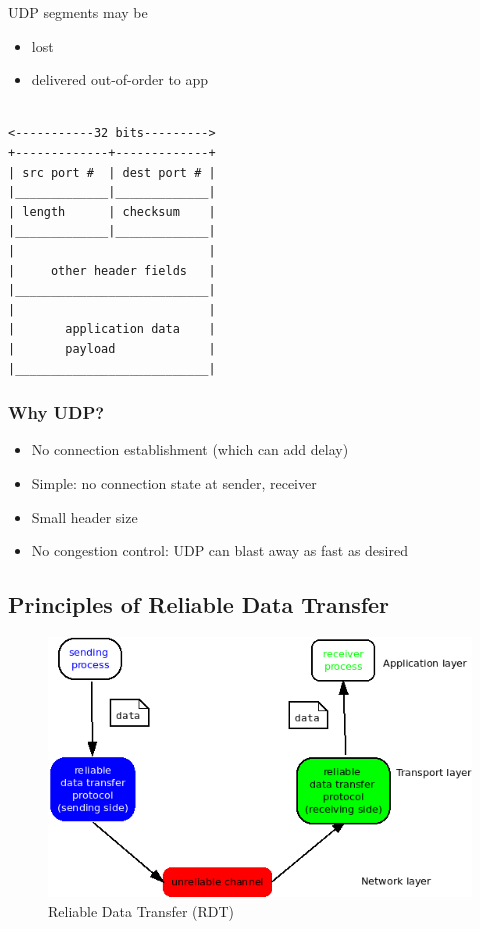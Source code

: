 \documentclass[11pt]{article}
\begin{document}
UDP segments may be
\begin{itemize}
\item lost
\item delivered out-of-order to app
\end{itemize}


\begin{verbatim}

<-----------32 bits--------->
+-------------+-------------+
| src port #  | dest port # |
|_____________|_____________|
| length      | checksum    |
|_____________|_____________|
|                           |
|     other header fields   |
|___________________________|
|                           |
|       application data    |   
|       payload             |
|___________________________|

\end{verbatim}

\subsubsection{Why UDP?}
\label{sec:orgfcea9e9}
\begin{itemize}
\item No connection establishment (which can add delay)
\item Simple: no connection state at sender, receiver
\item Small header size
\item No congestion control: UDP can blast away as fast as desired
\end{itemize}

\subsection{Principles of Reliable Data Transfer}
\label{sec:org3a78a62}

\begin{figure}[htbp]
\centering
\includegraphics[width=.9\linewidth]{../img/RDT.png}
\caption{Reliable Data Transfer (RDT)}
\end{figure}
\end{document}
